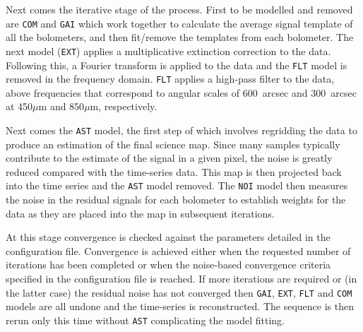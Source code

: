 \documentclass[twoside,11pt]{article}
\renewcommand{\_}{\texttt{\symbol{95}}}
\begin{document}
Next comes the iterative stage of the process. First to be modelled
and removed are \texttt{COM} and \texttt{GAI} which work together to
calculate the average signal template of all the bolometers, and then
fit/remove the templates from each bolometer. The next model
(\texttt{EXT}) applies a multiplicative extinction correction to the
data. Following this, a Fourier transform is applied to the data and
the \texttt{FLT} model is removed in the frequency domain.
\texttt{FLT} applies a high-pass filter to the data, above frequencies
that correspond to angular scales of 600~arcsec and 300~arcsec at
450$\mu$m and 850$\mu$m, respectively.

Next comes the \texttt{AST} model, the first step of which involves
regridding the data to produce an estimation of the final science map.
Since many samples typically contribute to the estimate of the signal
in a given pixel, the noise is greatly reduced compared with the
time-series data. This map is then projected back into the time series
and the \texttt{AST} model removed. The \texttt{NOI} model then
measures the noise in the residual signals for each bolometer to
establish weights for the data as they are placed into the map in
subsequent iterations.

At this stage convergence is checked against the parameters detailed
in the configuration file. Convergence is achieved either when the
requested number of iterations has been completed or when the
noise-based convergence criteria specified in the configuration file
is reached. If more iterations are required or (in the latter case)
the residual noise has not converged then \texttt{GAI}, \texttt{EXT},
\texttt{FLT} and \texttt{COM} models are all undone and the
time-series is reconstructed. The sequence is then rerun only this
time without \texttt{AST} complicating the model fitting.
\end{document}
